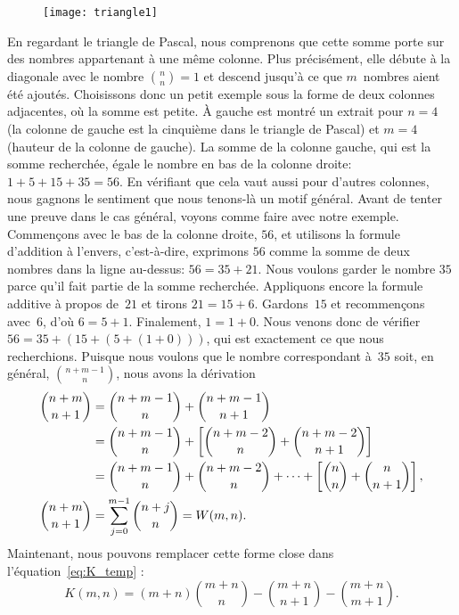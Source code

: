 %
\begin{wrapfigure}[6]{l}[0pt]{0pt}
\centering
\texttt{[image: triangle1]}%
\end{wrapfigure}
En regardant le triangle de Pascal, nous comprenons que cette somme
porte sur des nombres appartenant à une même colonne. Plus
précisément, elle débute à la diagonale avec le nombre \(\binom{n}{n}
= 1\) et descend jusqu'à ce que \(m\)~nombres aient été
ajoutés. Choisissons donc un petit exemple sous la forme de deux
colonnes adjacentes, où la somme est petite. À gauche est montré un
extrait pour \(n=4\) (la colonne de gauche est la cinquième dans le
triangle de Pascal) et \(m=4\) (hauteur de la colonne de gauche).  La
somme de la colonne gauche, qui est la somme recherchée, égale le
nombre en bas de la colonne droite: \(1 + 5 + 15 + 35 = 56\). En
vérifiant que cela vaut aussi pour d'autres colonnes, nous gagnons le
sentiment que nous tenons-là un motif général. Avant de tenter une
preuve dans le cas général, voyons comme faire avec notre
exemple. Commençons avec le bas de la colonne droite, \(56\), et
utilisons la formule d'addition à l'envers, c'est-à-dire, exprimons
\(56\) comme la somme de deux nombres dans la ligne au-dessus: \(56 =
35 + 21\). Nous voulons garder le nombre \(35\) parce qu'il fait
partie de la somme recherchée. Appliquons encore la formule additive à
propos de~\(21\) et tirons \(21 = 15 + 6\). Gardons~\(15\) et
recommençons avec~\(6\), d'où \(6 = 5 + 1\). Finalement, \(1 = 1 +
0\). Nous venons donc de vérifier \(56 = 35 + (15 + (5 + (1 + 0)))\),
qui est exactement ce que nous recherchions. Puisque nous voulons que
le nombre correspondant à~\(35\) soit, en général,
\(\binom{n+m-1}{n}\), nous avons la dérivation
\begin{align}
\binom{n+m}{n+1}
  &= \binom{n+m-1}{n} + \binom{n+m-1}{n+1}\notag\\
  &= \binom{n+m-1}{n} + \left[\binom{n+m-2}{n} +
     \binom{n+m-2}{n+1}\right]\notag\\
  &= \binom{n+m-1}{n} + \binom{n+m-2}{n} + \dots +
     \left[\binom{n}{n} + \binom{n}{n+1}\right],\notag\\
\binom{n+m}{n+1}
  &= \sum_{j=0}^{m-1}{\binom{n+j}{n}} = W(m,n).
\label{eq:binom_sum}
\end{align}
Maintenant, nous pouvons remplacer cette forme close dans
l'équation~\eqref{eq:K_temp} :
\begin{equation*}
K(m,n) = (m + n)
\binom{m+n}{n} - \binom{m+n}{n+1} - \binom{m+n}{m+1}.
\end{equation*}
